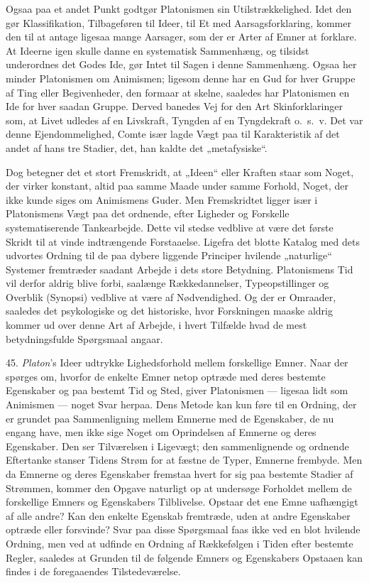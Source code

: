 \documentclass[12pt,a4paper]{book}
\newcommand{\apage}[1]{\marginnote{\footnotesize\textit{[#1]}}}
\begin{document}
Ogsaa paa et andet Punkt godtgør Platonismen sin Utilstrækkelighed. Idet
den gør Klassifikation, Tilbageføren til Ideer, til Et med
Aarsagsforklaring, kommer den til at antage ligesaa mange Aarsager, som
der er Arter af Emner at forklare. At Ideerne igen skulle danne en
systematisk Sammenhæng, og tilsidst underordnes det Godes Ide, gør Intet
til Sagen i denne Sammenhæng. Ogsaa her minder Platonismen om Animismen;
ligesom denne har en Gud for hver Gruppe af Ting eller Begivenheder, den
formaar at skelne, saaledes har Platonismen en Ide for hver saadan
Gruppe. Derved banedes Vej for den Art Skinforklaringer som, at Livet
udledes af en Livskraft, Tyngden af en Tyngdekraft o.\ s.\ v. Det var
denne Ejendommelighed, Comte især lagde Vægt paa til Karakteristik af
det andet af hans tre Stadier, det, han kaldte det „metafysiske“.

Dog betegner det et stort Fremskridt, at „Ideen“ eller Kraften staar som
Noget, der virker konstant, altid paa samme Maade under samme Forhold,
Noget, der ikke kunde siges om Animismens Guder. Men Fremskridtet ligger
især i \apage{121} Platonismens Vægt paa det ordnende, efter Ligheder og Forskelle
systematiserende Tankearbejde. Dette vil stedse vedblive at være det
første Skridt til at vinde indtrængende Forstaaelse. Ligefra det blotte
Katalog med dets udvortes Ordning til de paa dybere liggende Principer
hvilende „naturlige“ Systemer fremtræder saadant Arbejde i dets store
Betydning. Platonismens Tid vil derfor aldrig blive forbi, saalænge
Rækkedannelser, Typeopstillinger og Overblik (Synopsi) vedblive at være
af Nødvendighed. Og der er Omraader, saaledes det psykologiske og det
historiske, hvor Forskningen maaske aldrig kommer ud over denne Art af
Arbejde, i hvert Tilfælde hvad de mest betydningsfulde Spørgsmaal angaar.

45. \emph{Platon}'s Ideer udtrykke Lighedsforhold mellem forskellige
Emner. Naar der spørges om, hvorfor de enkelte Emner netop optræde med
deres bestemte Egenskaber og paa bestemt Tid og Sted, giver Platonismen
--- ligesaa lidt som Animismen --- noget Svar herpaa. Dens Metode kan
kun føre til en Ordning, der er grundet paa Sammenligning mellem Emnerne
med de Egenskaber, de nu engang have, men ikke sige Noget om Oprindelsen
af Emnerne og deres Egenskaber. Den ser Tilværelsen i Ligevægt; den
sammenlignende og ordnende Eftertanke stanser Tidens Strøm for at fæstne
de Typer, Emnerne frembyde. Men da Emnerne og deres Egenskaber fremstaa
hvert for sig paa bestemte Stadier af Strømmen, kommer den Opgave
naturligt op at undersøge Forholdet mellem de forskellige Emners og
Egenskabers Tilblivelse. Opstaar det ene Emne uafhængigt af alle andre?
Kan den enkelte Egenskab fremtræde, uden at andre Egenskaber optræde
eller forsvinde? Svar paa disse Spørgsmaal faas ikke ved en blot hvilende
Ordning, men ved at udfinde en Ordning af Rækkefølgen i Tiden efter
bestemte Regler, saaledes at Grunden til de følgende Emners og
Egenskabers Opstaaen kan findes i de foregaaendes Tilstedeværelse.
\end{document}
